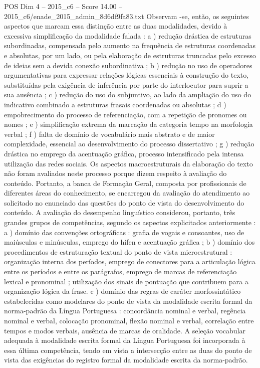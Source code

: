 \begin{textsample}{POS Dim 4 – 2015\_c6 – Score 14.00 – 2015\_c6/enade\_2015\_admin\_8d6df9fa83.txt}
Observam -se, então, os seguintes aspectos que marcam essa distinção entre as duas modalidades, devido à excessiva simplificação da modalidade falada : a ) redução drástica de estruturas subordinadas, compensada pelo aumento na frequência de estruturas coordenadas e absolutas, por um lado, ou pela elaboração de estruturas truncadas pelo excesso de ideias sem a devida conexão subordinativa ; b ) redução no uso de operadores argumentativas para expressar relações lógicas essenciais à construção do texto, substituídas pela exigência de inferência por parte do interlocutor para suprir a sua ausência ; c ) redução do uso do subjuntivo, ao lado da ampliação do uso do indicativo combinado a estruturas frasais coordenadas ou absolutas ; d ) empobrecimento do processo de referenciação, com a repetição de pronomes ou nomes ; e ) simplificação extrema da marcação da categoria tempo na morfologia verbal ; f ) falta de domínio de vocabulário mais abstrato e de maior complexidade, essencial ao desenvolvimento do processo dissertativo ; g ) redução drástica no emprego da acentuação gráfica, processo intensificado pela intensa utilização das redes sociais.
Os aspectos macroestruturais da elaboração do texto não foram avaliados neste processo porque dizem respeito à avaliação do conteúdo.
Portanto, a banca de Formação Geral, composta por profissionais de diferentes áreas do conhecimento, se encarregou da avaliação do atendimento ao solicitado no enunciado das questões do ponto de vista do desenvolvimento do conteúdo.
A avaliação do desempenho linguístico considerou, portanto, três grandes grupos de competências, segundo os aspectos explicitados anteriormente : a ) domínio das convenções ortográficas : grafia de vogais e consoantes, uso de maiúsculas e minúsculas, emprego do hífen e acentuação gráfica ; b ) domínio dos procedimentos de estruturação textual do ponto de vista microestrutural : organização interna dos períodos, emprego de conectores para a articulação lógica entre os períodos e entre os parágrafos, emprego de marcas de referenciação lexical e pronominal ; utilização dos sinais de pontuação que contribuem para a organização lógica da frase. c ) domínio das regras de caráter morfossintático estabelecidas como modelares do ponto de vista da modalidade escrita formal da norma-padrão da Língua Portuguesa : concordância nominal e verbal, regência nominal e verbal, colocação pronominal, flexão nominal e verbal, correlação entre tempos e modos verbais, ausência de marcas de oralidade.
A seleção vocabular adequada à modalidade escrita formal da Língua Portuguesa foi incorporada à essa última competência, tendo em vista a intersecção entre as duas do ponto de vista das exigências do registro formal da modalidade escrita da norma-padrão.

\end{textsample}
